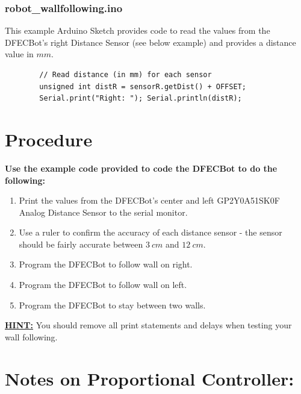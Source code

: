 \documentclass{handout}
\begin{document}
	\subsubsection{robot\_wallfollowing.ino}
	This example Arduino Sketch provides code to read the values from the DFECBot's right Distance Sensor (see below example) and provides a distance value in $mm$.
	
	\begin{lstlisting}
		// Read distance (in mm) for each sensor
		unsigned int distR = sensorR.getDist() + OFFSET;
		Serial.print("Right: "); Serial.println(distR);
	\end{lstlisting}
	
	\section{Procedure}
	\textbf{Use the example code provided to code the DFECBot to do the following:}
		
	\begin{enumerate}
		\item Print the values from the DFECBot's center and left GP2Y0A51SK0F Analog Distance Sensor to the serial monitor.
		\item Use a ruler to confirm the accuracy of each distance sensor - the sensor should be fairly accurate between $3\ cm$ and $12\ cm$.
		\item Program the DFECBot to follow wall on right.
		\item Program the DFECBot to follow wall on left.
		\item Program the DFECBot to stay between two walls.
	\end{enumerate} 	
	{\large \textbf{\underline{HINT:}}} You should remove all print statements and delays when testing your wall following.
	\section{Notes on Proportional Controller:}
	
\end{document}
